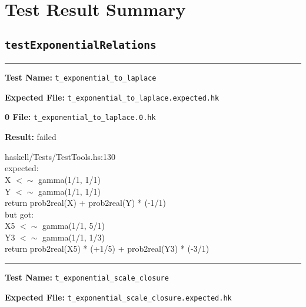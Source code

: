 \documentclass[11pt]{article}
\begin{document}
\lstset{language=Python, basicstyle=\tiny,breaklines=true,showspaces=false,showstringspaces=false,breakatwhitespace=true}

\section{Test Result Summary}









\subsection{{\tt testExponentialRelations}}

\hrule

\bigskip
\textbf{Test Name:} {\tt t\_exponential\_to\_laplace}

\textbf{Expected File:} {\tt t\_exponential\_to\_laplace.expected.hk}

\bigskip


\bigskip
\textbf{0 File:} {\tt t\_exponential\_to\_laplace.0.hk}

\bigskip


\bigskip
\textbf{Result:} failed

\bigskip
\noindent


\bigskip
\noindent
haskell/Tests/TestTools.hs:130\\expected:\\X $<\sim$ gamma(1/1, 1/1)\\Y $<\sim$ gamma(1/1, 1/1)\\return prob2real(X) + prob2real(Y) * (-1/1)\\but got:\\X5 $<\sim$ gamma(1/1, 5/1)\\Y3 $<\sim$ gamma(1/1, 1/3)\\return prob2real(X5) * (+1/5) + prob2real(Y3) * (-3/1)\\

\hrule

\bigskip
\textbf{Test Name:} {\tt t\_exponential\_scale\_closure}

\textbf{Expected File:} {\tt t\_exponential\_scale\_closure.expected.hk}

\bigskip

\end{document}

